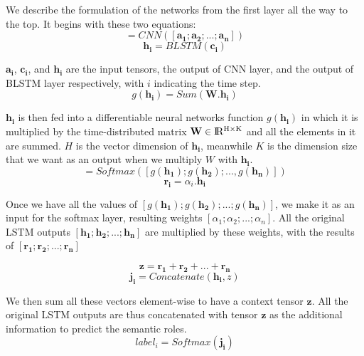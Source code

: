 We describe the formulation of the networks from the first layer all the way to the top. It begins with these two equations:
\begin{equation}
[\mathbf{c_{1}}; \mathbf{c_{2}}; ...; \mathbf{c_{n}}] = CNN([\mathbf{a_{1}}; \mathbf{a_{2}}; ...; \mathbf{a_{n}}])
\end{equation}
\begin{equation}
\mathbf{h_{i}} = BLSTM(\mathbf{c_{i}})
\end{equation}

$\mathbf{a_{i}}$, $\mathbf{c_{i}}$, and $\mathbf{h_{i}}$ are the input tensors, the output of CNN layer, and the output of BLSTM layer respectively, with $i$ indicating the time step. 
\begin{equation}
\label{sum_weight}
g(\mathbf{h_{i}}) = Sum(\mathbf{W}.\mathbf{h_{i}})
\end{equation}

$\mathbf{h_{i}}$ is then fed into a differentiable neural networks function $g(\mathbf{h_{i}})$ in which it is multiplied by the time-distributed matrix $\textbf{W} \in {\rm I\!R^{H \times K}}$ and all the elements in it are summed. $H$ is the vector dimension of $\mathbf{h_{i}}$, meanwhile $K$ is the dimension size that we want as an output when we multiply \textbf{$W$} with $\mathbf{h_{i}}$.
\begin{equation}
[\alpha_{1}, \alpha_{2}, ..., \alpha_{n}] = Softmax([g(\mathbf{h_{1}}); g(\mathbf{h_{2}}); ..., g(\mathbf{h_{n}})])
\end{equation}
\begin{equation}
\mathbf{r_{i}} = \alpha_{i}.\mathbf{h_{i}}
\end{equation}

Once we have all the values of $[g(\mathbf{h_{1}}); g(\mathbf{h_{2}}); ...; g(\mathbf{h_{n}})]$, we make it as an input for the softmax layer, resulting weights $[\alpha_{1}; \alpha_{2}; ...; \alpha_{n}]$. All the original LSTM outputs $[\mathbf{h_{1}}; \mathbf{h_{2}}; ...; \mathbf{h_{n}}]$ are multiplied by these weights, with the results of $[\mathbf{r_{1}}; \mathbf{r_{2}}; ...; \mathbf{r_{n}}]$


\begin{equation}
\mathbf{z} = \mathbf{r_{1}} + \mathbf{r_{2}} + ... + \mathbf{r_{n}}
\end{equation}
\begin{equation}
\mathbf{j_{i}} = Concatenate(\mathbf{h_{i}}, z)
\end{equation}

We then sum all these vectors element-wise to have a context tensor $\mathbf{z}$. 
All the original LSTM outputs are thus concatenated with tensor $\mathbf{z}$ as the additional information to predict the semantic roles.
\begin{equation}
label_{i} = Softmax(\mathbf{j_{i}})
\end{equation}

